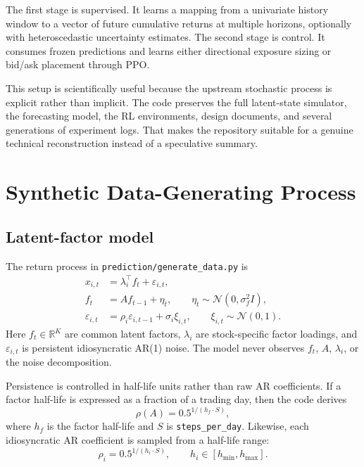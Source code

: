 \documentclass[11pt]{article}
\begin{document}
The first stage is supervised. It learns a mapping from a univariate history window to a vector of future cumulative returns at multiple horizons, optionally with heteroscedastic uncertainty estimates. The second stage is control. It consumes frozen predictions and learns either directional exposure sizing or bid/ask placement through PPO.

This setup is scientifically useful because the upstream stochastic process is explicit rather than implicit. The code preserves the full latent-state simulator, the forecasting model, the RL environments, design documents, and several generations of experiment logs. That makes the repository suitable for a genuine technical reconstruction instead of a speculative summary.

\section{Synthetic Data-Generating Process}
\subsection{Latent-factor model}
The return process in \texttt{prediction/generate\_data.py} is
\begin{align}
x_{i,t} &= \lambda_i^\top f_t + \varepsilon_{i,t}, \\
f_t &= A f_{t-1} + \eta_t, \qquad \eta_t \sim \mathcal{N}(0,\sigma_f^2 I), \\
\varepsilon_{i,t} &= \rho_i \varepsilon_{i,t-1} + \sigma_i \xi_{i,t}, \qquad \xi_{i,t} \sim \mathcal{N}(0,1).
\end{align}
Here \(f_t \in \mathbb{R}^{K}\) are common latent factors, \(\lambda_i\) are stock-specific factor loadings, and \(\varepsilon_{i,t}\) is persistent idiosyncratic AR(1) noise. The model never observes \(f_t\), \(A\), \(\lambda_i\), or the noise decomposition.

Persistence is controlled in half-life units rather than raw AR coefficients. If a factor half-life is expressed as a fraction of a trading day, then the code derives
\[
\rho(A) = 0.5^{1 / (h_f \cdot S)},
\]
where \(h_f\) is the factor half-life and \(S\) is \texttt{steps\_per\_day}. Likewise, each idiosyncratic AR coefficient is sampled from a half-life range:
\[
\rho_i = 0.5^{1 / (h_i \cdot S)}, \qquad h_i \in [h_{\min}, h_{\max}].
\]
\end{document}

